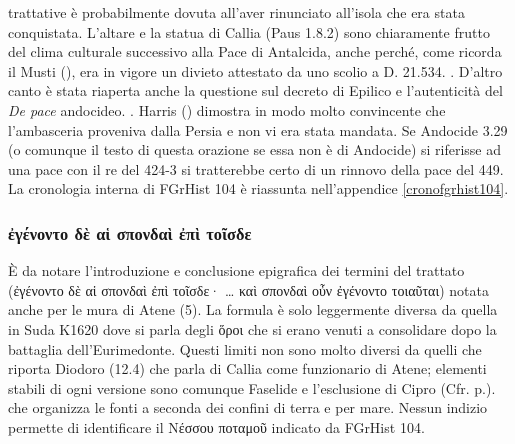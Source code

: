 {trattative è probabilmente dovuta all'aver rinunciato all'isola che era stata conquistata. L'altare e la statua di Callia (Paus 1.8.2) sono chiaramente frutto del clima culturale successivo alla Pace di Antalcida, anche perché, come ricorda il Musti (\cite[286]{Musti1982}), era in vigore un divieto attestato da uno scolio a D. 21.534. \cite[175]{CulassoGastaldi1990}. D'altro canto è stata riaperta anche la questione sul decreto di Epilico e l'autenticità del \emph{De pace} andocideo. \cite{Blamire1975}. Harris (\cite[123s]{Harris1999}) dimostra in modo molto convincente che l'ambasceria proveniva dalla Persia e non vi era stata mandata. Se Andocide 3.29 (o comunque il testo di questa orazione se essa non è di Andocide) si riferisse ad una pace con il re del 424-3 si tratterebbe certo di un rinnovo della pace del 449. La cronologia interna di FGrHist 104 è riassunta nell'appendice \ref{cronofgrhist104}. 
            \subsubsection{\textgreek{ἐγένοντο δὲ αἱ σπονδαὶ ἐπὶ τοῖσδε}} 
            È da notare l'introduzione e conclusione epigrafica dei termini del trattato (\textgreek{ἐγένοντο δὲ αἱ σπονδαὶ ἐπὶ τοῖσδε·  … καὶ σπονδαὶ οὖν ἐγένοντο τοιαῦται}) notata anche per le mura di Atene (5). La formula è solo leggermente diversa da quella in Suda K1620 dove si parla degli \textgreek{ὅροι} che si erano venuti a consolidare dopo la battaglia dell'Eurimedonte. Questi limiti non sono molto diversi da quelli che riporta  Diodoro (12.4) che parla di Callia come funzionario di Atene; elementi stabili di ogni versione sono comunque Faselide e l'esclusione di Cipro (Cfr. p.\pageref{pacedicallia}). \cite[477-8]{Meiggs1972} che organizza le fonti a seconda dei confini di terra e per mare. Nessun indizio permette di identificare il \textgreek{Νέσσου ποταμοῦ} indicato da FGrHist 104.
}
